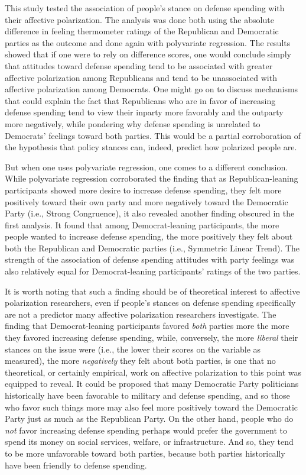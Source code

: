 \documentclass[authordate, meta]{jote-new-article}
\begin{document}
	This study tested the association of people's stance on defense spending with their affective polarization. The analysis was done both using the absolute difference in feeling thermometer ratings of the Republican and Democratic parties as the outcome and done again with polyvariate regression. The results showed that if one were to rely on difference scores, one would conclude simply that attitudes toward defense spending tend to be associated with greater affective polarization among Republicans and tend to be unassociated with affective polarization among Democrats. One might go on to discuss mechanisms that could explain the fact that Republicans who are in favor of increasing defense spending tend to view their inparty more favorably and the outparty more negatively, while pondering why defense spending is unrelated to Democrats' feelings toward both parties. This would be a partial corroboration of the hypothesis that policy stances can, indeed, predict how polarized people are.



	But when one uses polyvariate regression, one comes to a different conclusion. While polyvariate regression corroborated the finding that as Republican-leaning participants showed more desire to increase defense spending, they felt more positively toward their own party and more negatively toward the Democratic Party (i.e., Strong Congruence), it also revealed another finding obscured in the first analysis. It found that among Democrat-leaning participants, the more people wanted to increase defense spending, the more positively they felt about both the Republican and Democratic parties (i.e., Symmetric Linear Trend). The strength of the association of defense spending attitudes with party feelings was also relatively equal for Democrat-leaning participants' ratings of the two parties.



	It is worth noting that such a finding should be of theoretical interest to affective polarization researchers, even if people's stances on defense spending specifically are not a predictor many affective polarization researchers investigate. The finding that Democrat-leaning participants favored \emph{both} parties more the more they favored increasing defense spending, while, conversely, the more \emph{liberal} their stances on the issue were (i.e., the lower their scores on the variable as measured), the more \emph{negatively} they felt about both parties, is one that no theoretical, or certainly empirical, work on affective polarization to this point was equipped to reveal. It could be proposed that many Democratic Party politicians historically have been favorable to military and defense spending, and so those who favor such things more may also feel more positively toward the Democratic Party just as much as the Republican Party. On the other hand, people who do \emph{not} favor increasing defense spending perhaps would prefer the government to spend its money on social services, welfare, or infrastructure. And so, they tend to be more unfavorable toward both parties, because both parties historically have been friendly to defense spending.
\end{document}
